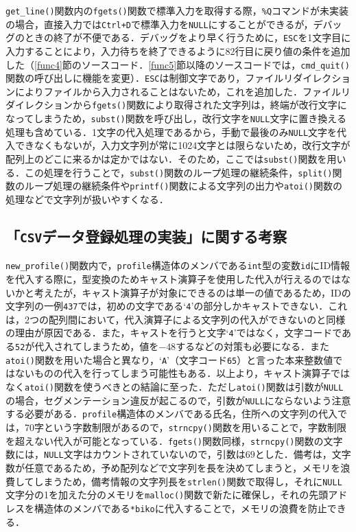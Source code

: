 \verb|get_line()|関数内の\verb|fgets()|関数で標準入力を取得する際，\verb|%Q|コマンドが未実装の場合，直接入力では\verb|Ctrl+D|で標準入力を\verb|NULL|にすることができるが，デバッグのときの終了が不便である．デバッグをより早く行うために，\verb|ESC|を1文字目に入力することにより，入力待ちを終了できるように82行目に戻り値の条件を追加した（\ref{func4}節のソースコード．\ref{func5}節以降のソースコードでは，\verb|cmd_quit()|関数の呼び出しに機能を変更）．\verb|ESC|は制御文字であり，ファイルリダイレクションによりファイルから入力されることはないため，これを追加した\cite{www:label2}．ファイルリダイレクションから\verb|fgets()|関数により取得された文字列は，終端が改行文字になってしまうため，\verb|subst()|関数を呼び出し，改行文字を\verb|NULL|文字に置き換える処理も含めている．1文字の代入処理であるから，手動で最後のみ\verb|NULL|文字を代入できなくもないが，入力文字列が常に1024文字とは限らないため，改行文字が配列上のどこに来るかは定かではない．そのため，ここでは\verb|subst()|関数を用いる．この処理を行うことで，\verb|subst()|関数のループ処理の継続条件，\verb|split()|関数のループ処理の継続条件や\verb|printf()|関数による文字列の出力や\verb|atoi()|関数の処理などで文字列が扱いやすくなる．

\subsection{「\texttt{CSV}データ登録処理の実装」に関する考察}

\verb|new_profile()|関数内で，\verb|profile|構造体のメンバである\verb|int|型の変数\verb|id|にID情報を代入する際に，型変換のためキャスト演算子を使用した代入が行えるのではないかと考えたが，キャスト演算子が対象にできるのは単一の値であるため，IDの文字列の一例\verb|437|では，初めの文字である‘\verb|4|’の部分しかキャストできない．これは，2つの配列間において，代入演算子による文字列の代入ができないのと同様の理由が原因である．また，キャストを行うと文字‘\verb|4|’ではなく，文字コードである\verb|52|が代入されてしまうため，値を$-48$するなどの対策も必要になる．また\verb|atoi()|関数を用いた場合と異なり，‘\verb|A|’（文字コード\verb|65|）と言った本来整数値ではないものの代入を行ってしまう可能性もある．以上より，キャスト演算子ではなく\verb|atoi()|関数を使うべきとの結論に至った．ただし\verb|atoi()|関数は引数が\verb|NULL|の場合，セグメンテーション違反が起こるので，引数が\verb|NULL|にならないよう注意する必要がある\cite{www:label7}．\verb|profile|構造体のメンバである氏名，住所への文字列の代入では，70字という字数制限があるので，\verb|strncpy()|関数を用いることで，字数制限を超えない代入が可能となっている．\verb|fgets()|関数同様，\verb|strncpy()|関数の文字数には，\verb|NULL|文字はカウントされていないので，引数は$69$とした．備考は，文字数が任意であるため，予め配列などで文字列を長を決めてしまうと，メモリを浪費してしまうため，備考情報の文字列長を\verb|strlen()|関数で取得し，それに\verb|NULL|文字分の1を加えた分のメモリを\verb|malloc()|関数で新たに確保し，それの先頭アドレスを構造体のメンバである\verb|*biko|に代入することで，メモリの浪費を防止できる．

